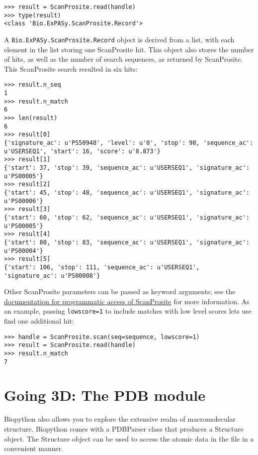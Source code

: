 \documentclass{report}
\begin{document}
\begin{verbatim}
>>> result = ScanProsite.read(handle)
>>> type(result)
<class 'Bio.ExPASy.ScanProsite.Record'>
\end{verbatim}

A \verb+Bio.ExPASy.ScanProsite.Record+ object is derived from a list, with each element in the list storing one ScanProsite hit. This object also stores the number of hits, as well as the number of search sequences, as returned by ScanProsite. This ScanProsite search resulted in six hits:

\begin{verbatim}
>>> result.n_seq
1
>>> result.n_match
6
>>> len(result)
6
>>> result[0]
{'signature_ac': u'PS50948', 'level': u'0', 'stop': 98, 'sequence_ac': u'USERSEQ1', 'start': 16, 'score': u'8.873'}
>>> result[1]
{'start': 37, 'stop': 39, 'sequence_ac': u'USERSEQ1', 'signature_ac': u'PS00005'}
>>> result[2]
{'start': 45, 'stop': 48, 'sequence_ac': u'USERSEQ1', 'signature_ac': u'PS00006'}
>>> result[3]
{'start': 60, 'stop': 62, 'sequence_ac': u'USERSEQ1', 'signature_ac': u'PS00005'}
>>> result[4]
{'start': 80, 'stop': 83, 'sequence_ac': u'USERSEQ1', 'signature_ac': u'PS00004'}
>>> result[5]
{'start': 106, 'stop': 111, 'sequence_ac': u'USERSEQ1', 'signature_ac': u'PS00008'}
\end{verbatim}

Other ScanProsite parameters can be passed as keyword arguments; see the \href{http://www.expasy.org/tools/scanprosite/ScanPrositeREST.html}{documentation for programmatic access of ScanProsite} for more information. As an example, passing \verb+lowscore=1+ to include matches with low level scores lets use find one additional hit:

\begin{verbatim}
>>> handle = ScanProsite.scan(seq=sequence, lowscore=1)
>>> result = ScanProsite.read(handle)
>>> result.n_match
7
\end{verbatim}

\chapter{Going 3D: The PDB module}

Biopython also allows you to explore the extensive realm of macromolecular structure.
Biopython comes with a PDBParser class that produces a Structure object. The Structure object
can be used to access the atomic data in the file in a convenient manner.

\end{document}
